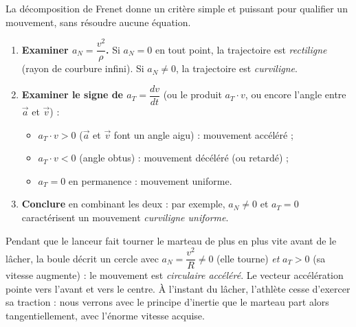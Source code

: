 \documentclass[11pt]{article}
\newcommand{\cle}[1]{{\popxbold\color{popdark}#1}}
\begin{document}
La décomposition de Frenet donne un critère simple et puissant pour qualifier un mouvement, sans résoudre aucune équation.

\begin{methode}
\begin{enumerate}
\item \textbf{Examiner $a_N = \dfrac{v^2}{\rho}$.} Si $a_N = 0$ en tout point, la trajectoire est \emph{rectiligne} (rayon de courbure infini). Si $a_N \neq 0$, la trajectoire est \emph{curviligne}.
\item \textbf{Examiner le signe de $a_T = \dfrac{dv}{dt}$} (ou le produit $a_T \cdot v$, ou encore l'angle entre $\vec{a}$ et $\vec{v}$) :
\begin{itemize}
\item $a_T \cdot v > 0$ ($\vec{a}$ et $\vec{v}$ font un angle aigu) : mouvement \cle{accéléré} ;
\item $a_T \cdot v < 0$ (angle obtus) : mouvement \cle{décéléré} (ou retardé) ;
\item $a_T = 0$ en permanence : mouvement \cle{uniforme}.
\end{itemize}
\item \textbf{Conclure} en combinant les deux : par exemple, $a_N \neq 0$ et $a_T = 0$ caractérisent un mouvement \emph{curviligne uniforme}.
\end{enumerate}
\end{methode}

\begin{exemplebox}
Pendant que le lanceur fait tourner le marteau de plus en plus vite avant de le lâcher, la boule décrit un cercle avec $a_N = \dfrac{v^2}{R} \neq 0$ (elle tourne) \emph{et} $a_T > 0$ (sa vitesse augmente) : le mouvement est \emph{circulaire accéléré}. Le vecteur accélération pointe vers l'avant et vers le centre. À l'instant du lâcher, l'athlète cesse d'exercer sa traction : nous verrons avec le principe d'inertie que le marteau part alors tangentiellement, avec l'énorme vitesse acquise.
\end{exemplebox}
\end{document}
